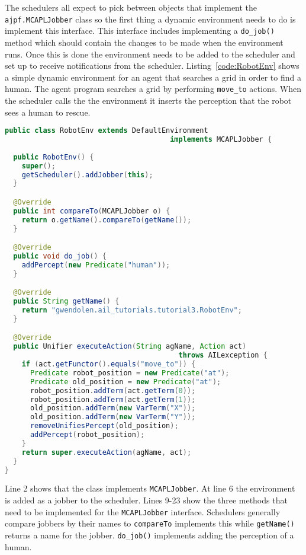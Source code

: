 \documentclass[a4]{article}
\begin{document}
\begin{sloppypar}
The schedulers all expect to pick between objects that implement the \texttt{ajpf.MCAPLJobber} class so the first thing a dynamic environment needs to do is implement this interface.  This interface includes implementing a \texttt{do\_job()} method which should contain the changes to be made when the environment runs.  Once this is done the environment needs to be added to the scheduler and set up to receive notifications from the scheduler.  Listing~\ref{code:RobotEnv} shows a simple dynamic environment for an agent that searches a grid in order to find a human.  The agent program searches a grid by performing \lstinline{move_to} actions.  When the scheduler calls the the environment it inserts the perception that the robot sees a human to rescue.  
\end{sloppypar}
\begin{lstlisting}[float,caption=RobotEnv,basicstyle=\sffamily,language=Java,style=easslisting,label=code:RobotEnv]
public class RobotEnv extends DefaultEnvironment
                                       implements MCAPLJobber {
	
  public RobotEnv() {
    super();
    getScheduler().addJobber(this);
  }

  @Override
  public int compareTo(MCAPLJobber o) {
    return o.getName().compareTo(getName());
  }

  @Override
  public void do_job() {
    addPercept(new Predicate("human"));
  }

  @Override
  public String getName() {
    return "gwendolen.ail_tutorials.tutorial3.RobotEnv";
  }   

  @Override
  public Unifier executeAction(String agName, Action act) 
                                         throws AILexception {
    if (act.getFunctor().equals("move_to")) {
      Predicate robot_position = new Predicate("at");
      Predicate old_position = new Predicate("at");
      robot_position.addTerm(act.getTerm(0));
      robot_position.addTerm(act.getTerm(1));
      old_position.addTerm(new VarTerm("X"));
      old_position.addTerm(new VarTerm("Y"));
      removeUnifiesPercept(old_position);
      addPercept(robot_position);
    }
    return super.executeAction(agName, act);
  }
}
\end{lstlisting}
Line 2 shows that the class implements \texttt{MCAPLJobber}.  At line 6 the environment is added as a jobber to the scheduler.  Lines 9-23 show the three methods that need to be implemented for the \texttt{MCAPLJobber} interface.  Schedulers generally compare jobbers by their names to \texttt{compareTo} implements this while \texttt{getName()} returns a name for the jobber.  \texttt{do\_job()} implements adding the perception of a human.
\end{document}
